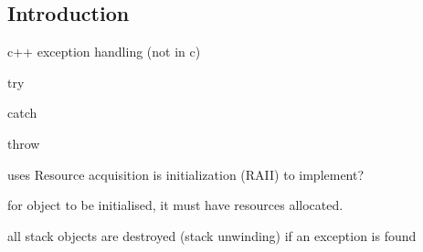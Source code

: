 
\subsection{Introduction}


c++ exception handling (not in c)

try

catch

throw

uses Resource acquisition is initialization (RAII) to implement?

for object to be initialised, it must have resources allocated.

all stack objects are destroyed (stack unwinding) if an exception is found
